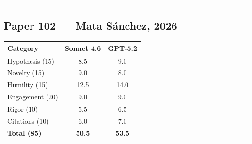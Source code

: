 \documentclass[11pt]{article}
\begin{document}
\bigskip
\hrule
\bigskip

\subsection*{Paper 102 --- Mata Sánchez, 2026}

\medskip

\begin{tabular}{lcc}
\toprule
\textbf{Category} & \textbf{Sonnet 4.6} & \textbf{GPT-5.2} \\
\midrule
Hypothesis (15) & 8.5 & 9.0 \\
Novelty (15) & 9.0 & 8.0 \\
Humility (15) & 12.5 & 14.0 \\
Engagement (20) & 9.0 & 9.0 \\
Rigor (10) & 5.5 & 6.5 \\
Citations (10) & 6.0 & 7.0 \\
\midrule
\textbf{Total (85)} & \textbf{50.5} & \textbf{53.5} \\
\bottomrule
\end{tabular}

\bigskip
\end{document}
